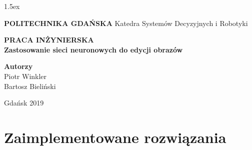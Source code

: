 \documentclass[10pt, a4paper, twoside]{article}
\begin{document}
\parskip 1.5ex %

\baselineskip=15pt  %
\linespread{1.3} %



\begin{titlepage}
  \begin{center}

    \vspace*{1cm}
    \Huge
    \textbf{POLITECHNIKA GDAŃSKA}
    \newline
    \vspace{0.5cm}
    \LARGE
    \newline
    Katedra Systemów Decyzyjnych i Robotyki

    \vspace{1.5cm}
    \textbf{PRACA INŻYNIERSKA}
    \\[0.5cm]
    \textbf{Zastosowanie sieci neuronowych do edycji obrazów}

    \vspace{2.5cm}
    \Large
    \textbf{Autorzy}\\
    Piotr Winkler\\
    Bartosz Bieliński

    \vspace{3.5cm}
    Gdańsk 2019

  \end{center}
\end{titlepage}

\setcounter{page}{2}






\newpage
  \tableofcontents







\section{Zaimplementowane rozwiązania}
\end{document}

